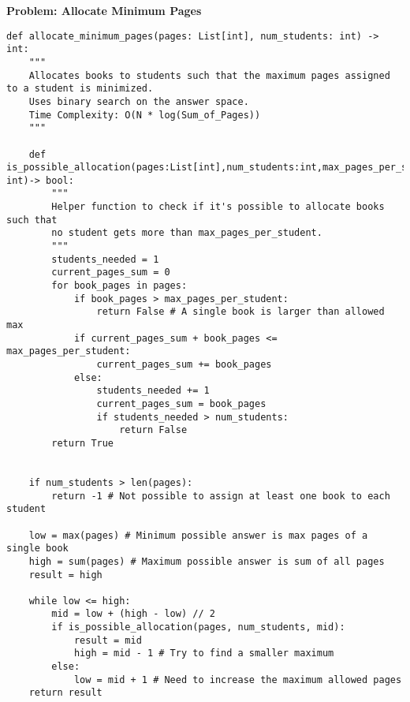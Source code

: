 \noindent\textbf{Problem: Allocate Minimum Pages}
\begin{verbatim}
def allocate_minimum_pages(pages: List[int], num_students: int) -> int:
    """
    Allocates books to students such that the maximum pages assigned to a student is minimized.
    Uses binary search on the answer space.
    Time Complexity: O(N * log(Sum_of_Pages))
    """

    def is_possible_allocation(pages:List[int],num_students:int,max_pages_per_student: int)-> bool:
        """
        Helper function to check if it's possible to allocate books such that
        no student gets more than max_pages_per_student.
        """
        students_needed = 1
        current_pages_sum = 0
        for book_pages in pages:
            if book_pages > max_pages_per_student:
                return False # A single book is larger than allowed max
            if current_pages_sum + book_pages <= max_pages_per_student:
                current_pages_sum += book_pages
            else:
                students_needed += 1
                current_pages_sum = book_pages
                if students_needed > num_students:
                    return False
        return True

    
    if num_students > len(pages):
        return -1 # Not possible to assign at least one book to each student

    low = max(pages) # Minimum possible answer is max pages of a single book
    high = sum(pages) # Maximum possible answer is sum of all pages
    result = high

    while low <= high:
        mid = low + (high - low) // 2
        if is_possible_allocation(pages, num_students, mid):
            result = mid
            high = mid - 1 # Try to find a smaller maximum
        else:
            low = mid + 1 # Need to increase the maximum allowed pages
    return result
\end{verbatim}

